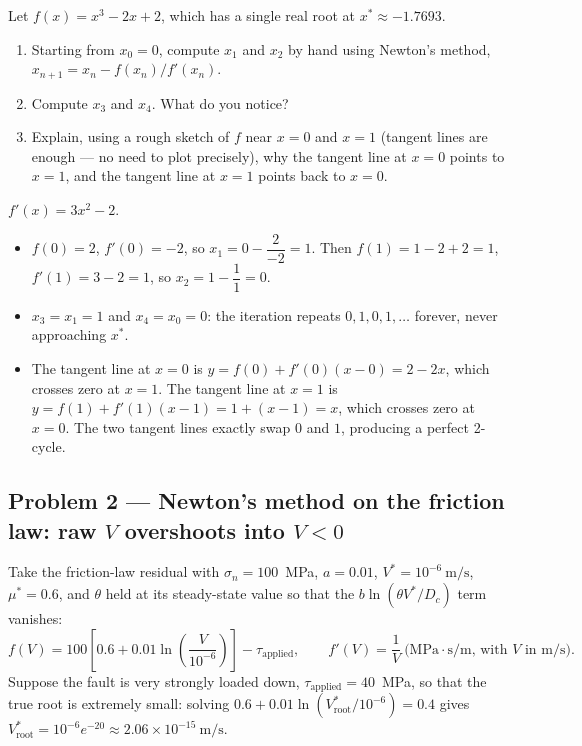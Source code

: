 Let $f(x) = x^3 - 2x + 2$, which has a single real root at $x^\ast \approx -1.7693$.

\begin{enumerate}[label=(\alph*)]
\item Starting from $x_0 = 0$, compute $x_1$ and $x_2$ by hand using Newton's method, $x_{n+1} = x_n - f(x_n)/f'(x_n)$.
\item Compute $x_3$ and $x_4$. What do you notice?
\item Explain, using a rough sketch of $f$ near $x=0$ and $x=1$ (tangent lines are enough --- no need to plot precisely), why the tangent line at $x=0$ points to $x=1$, and the tangent line at $x=1$ points back to $x=0$.
\end{enumerate}

\solution $f'(x) = 3x^2-2$.
\begin{itemize}
\item[(a)] $f(0)=2$, $f'(0)=-2$, so $x_1 = 0 - \dfrac{2}{-2} = 1$. Then $f(1)=1-2+2=1$, $f'(1)=3-2=1$, so $x_2 = 1 - \dfrac{1}{1} = 0$.
\item[(b)] $x_3 = x_1 = 1$ and $x_4 = x_0 = 0$: the iteration repeats $0,1,0,1,\dots$ forever, never approaching $x^\ast$.
\item[(c)] The tangent line at $x=0$ is $y = f(0)+f'(0)(x-0) = 2-2x$, which crosses zero at $x=1$. The tangent line at $x=1$ is $y=f(1)+f'(1)(x-1) = 1+(x-1)=x$, which crosses zero at $x=0$. The two tangent lines exactly swap $0$ and $1$, producing a perfect 2-cycle.
\end{itemize}


\subsection*{Problem 2 --- Newton's method on the friction law: raw $V$ overshoots into $V<0$}

Take the friction-law residual with $\sigma_n=100$~MPa, $a=0.01$, $V^\ast=10^{-6}\ \mathrm{m/s}$, $\mu^\ast=0.6$, and $\theta$ held at its steady-state value so that the $b\ln(\theta V^\ast/D_c)$ term vanishes:
\begin{equation*}
f(V) = 100\left[0.6 + 0.01\ln\!\left(\frac{V}{10^{-6}}\right)\right] - \tau_{\mathrm{applied}}, \qquad f'(V) = \frac{1}{V}\ \text{(MPa$\cdot$s/m, with $V$ in m/s)}.
\end{equation*}
Suppose the fault is very strongly loaded down, $\tau_{\mathrm{applied}} = 40$~MPa, so that the true root is extremely small: solving $0.6+0.01\ln(V^\ast_{\mathrm{root}}/10^{-6})=0.4$ gives $V^\ast_{\mathrm{root}} = 10^{-6}e^{-20} \approx 2.06\times10^{-15}\ \mathrm{m/s}$.

